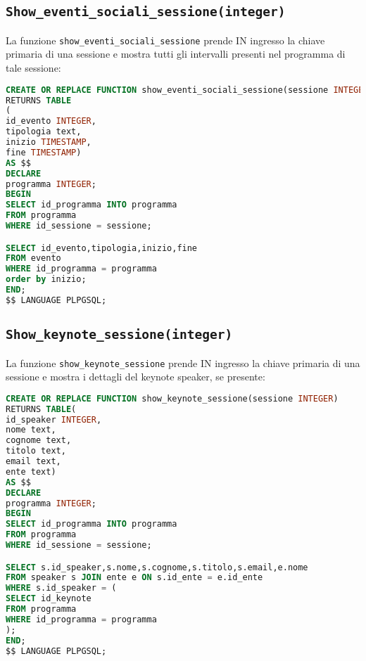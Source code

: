 \subsection{\texttt{Show\_eventi\_sociali\_sessione(integer)}}
La funzione \texttt{show\_eventi\_sociali\_sessione} prende IN ingresso la chiave primaria di una sessione e mostra tutti gli intervalli presenti nel programma di tale sessione:
\begin{lstlisting}[language=SQL,style=mystyle]
CREATE OR REPLACE FUNCTION show_eventi_sociali_sessione(sessione INTEGER)
RETURNS TABLE
(
id_evento INTEGER,
tipologia text,
inizio TIMESTAMP,
fine TIMESTAMP) 
AS $$
DECLARE 
programma INTEGER;
BEGIN
SELECT id_programma INTO programma
FROM programma
WHERE id_sessione = sessione;

SELECT id_evento,tipologia,inizio,fine
FROM evento
WHERE id_programma = programma
order by inizio;
END;
$$ LANGUAGE PLPGSQL;
\end{lstlisting}
\subsection{\texttt{Show\_keynote\_sessione(integer)}}
La funzione \texttt{show\_keynote\_sessione} prende IN ingresso la chiave primaria di una sessione e mostra i dettagli del keynote speaker, se presente:
\begin{lstlisting}[language=SQL,style=mystyle]
CREATE OR REPLACE FUNCTION show_keynote_sessione(sessione INTEGER)
RETURNS TABLE(
id_speaker INTEGER,
nome text,
cognome text,
titolo text,
email text,
ente text) 
AS $$
DECLARE 
programma INTEGER;
BEGIN
SELECT id_programma INTO programma
FROM programma
WHERE id_sessione = sessione;

SELECT s.id_speaker,s.nome,s.cognome,s.titolo,s.email,e.nome
FROM speaker s JOIN ente e ON s.id_ente = e.id_ente
WHERE s.id_speaker = (
SELECT id_keynote
FROM programma
WHERE id_programma = programma
);
END;
$$ LANGUAGE PLPGSQL;
\end{lstlisting}
